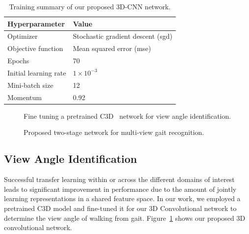 \begin{table}
	\centering
	\caption{Training summary of our proposed 3D-CNN network.  \label{table:summary_3dcnn}}
	\begin{tabular*}{30pc}{@{\extracolsep{\fill}}ll@{}}
			\hline \noalign{\vspace{3pt}}
			\textbf{Hyperparameter} & \textbf{Value} \\ \hline\noalign{\vspace{3pt}}
			Optimizer  &Stochastic gradient descent (\gls{sgd})  \\ [3pt]
			Objective function  &Mean squared error (\gls{mse}) \\ [3pt]
			Epochs  &70  \\ [3pt]
			Initial learning rate & $1 \times 10^{-3}$ \\ [3pt]
			Mini-batch size	  &12  \\ [3pt]
			Momentum  &0.92 \\ [3pt]
			\hline
	\end{tabular*}
\end{table}

\begin{figure}[t]
	\caption[Fine tuning a pretrained C3D network for view angle identification.]
	{Fine tuning a pretrained C3D~\cite{Tran_15} network for view angle identification. \label{fig:3D_CNN}
	}
\end{figure}

\begin{figure}
	\caption[Proposed two-stage network for multi-view gait recognition.]
	{Proposed two-stage network for multi-view gait recognition.\label{fig:two-stage_network}
	}
\end{figure}


\subsection{View Angle Identification}
Successful transfer learning within or across the different domains of interest leads to significant improvement in performance due to the amount of jointly learning representations in a shared feature space. In our work, we employed a pretrained C3D model and fine-tuned it for our 3D Convolutional network to determine the view angle of walking from gait. Figure~\ref{fig:3D_CNN} shows our proposed 3D convolutional network. 

